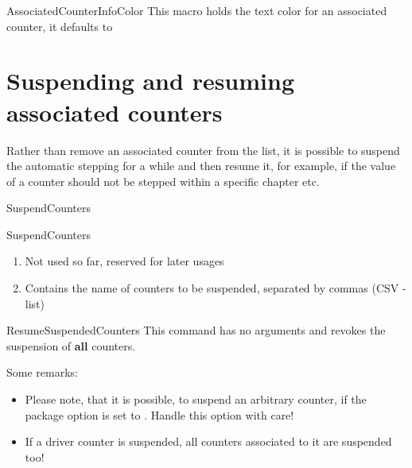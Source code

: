 \documentclass[12pt,paper=a4]{ltxdoc}
\begin{document}
\begin{docCommand}{AssociatedCounterInfoColor}{}
This macro holds the text color for an associated counter, it defaults to \meta{\textcolor{\AssociatedCounterInfoColor}{\expandafter\AssociatedCounterInfoColor}}%
\end{docCommand}

\begin{dispExample}
\end{dispExample}



\section{Suspending and resuming associated counters}\label{section::suspendedresumedcounters}

Rather than remove an associated counter from the list, it is possible to suspend the automatic stepping for a while and then resume it, for example, if the value of a counter should not be stepped within a specific chapter etc. 

\begin{docCommand}{SuspendCounters}{}%
\begin{docCommandArgs}{SuspendCounters}%

\begin{enumerate}[label={\textcolor{blue}{\#\arabic*}}]
\item {}%

  Not used so far, reserved for later usages

\item {}%

  Contains the name of counters to be suspended, separated by commas (CSV - list)
\end{enumerate}

\end{docCommandArgs}
\end{docCommand}%

\begin{docCommand}{ResumeSuspendedCounters}{}
  This command has no arguments and revokes the suspension of \textbf{all} counters.
\end{docCommand}


Some remarks:

\begin{itemize}
\item 
Please note, that it is possible, to suspend an arbitrary counter, if the package option  is set to . Handle this option with care!
\item If a driver counter is suspended, all counters associated to it are suspended too!
\end{itemize}%
\end{document}
